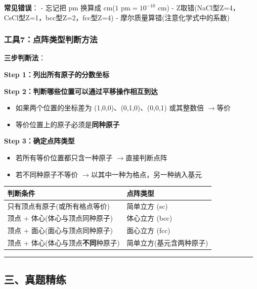 \documentclass[a4paper,11pt]{ctexart}
\providecommand{\tightlist}{\setlength{\itemsep}{0pt}\setlength{\parskip}{0pt}}
\newcounter{none}
\newcommand{\箭}{\ensuremath{\rightarrow}}
\newcommand{\左箭}{\ensuremath{\leftarrow}}
\newcommand{\上箭}{\ensuremath{\uparrow}}
\newcommand{\下箭}{\ensuremath{\downarrow}}
\newcommand{\衡}{\ensuremath{\rightleftharpoons}}
\newcommand{\双箭}{\ensuremath{\leftrightarrow}}
\newcommand{\约等于}{\ensuremath{\approx}}
\newcommand{\小于等于}{\ensuremath{\leq}}
\newcommand{\大于等于}{\ensuremath{\geq}}
\newcommand{\不等于}{\ensuremath{\neq}}
\newcommand{\西格马}{\ensuremath{\sigma}}
\newcommand{\派}{\ensuremath{\pi}}
\begin{document}
\textbf{常见错误}：
- 忘记把 pm 换算成 cm(\(1 \text{ pm} = 10^{-10} \text{ cm}\))
- Z取错(NaCl型Z=4，CsCl型Z=1，bcc型Z=2，fcc型Z=4)
- 摩尔质量算错(注意化学式中的系数)

\subsubsection{工具7：点阵类型判断方法}\label{ux5de5ux51777ux70b9ux9635ux7c7bux578bux5224ux65adux65b9ux6cd5}

\textbf{三步判断法}：

\textbf{Step 1：列出所有原子的分数坐标}

\textbf{Step 2：判断哪些位置可以通过平移操作相互到达}

\begin{itemize}
\tightlist
\item
  如果两个位置的坐标差为 (1,0,0)、(0,1,0)、(0,0,1) 或其整数倍 \箭 等价
\item
  等价位置上的原子必须是\textbf{同种原子}
\end{itemize}

\textbf{Step 3：确定点阵类型}

\begin{itemize}
\tightlist
\item
  若所有等价位置都只含一种原子 \箭 直接判断点阵
\item
  若不同种原子不等价 \箭 以其中一种为格点，另一种纳入基元
\end{itemize}

{\def\LTcaptype{none} %
\begin{longtable}[]{@{}ll@{}}
\toprule\noalign{}
判断条件 & 点阵类型 \\
\midrule\noalign{}
\endhead
\bottomrule\noalign{}
\endlastfoot
只有顶点有原子(或所有格点等价) & 简单立方 (sc) \\
顶点 + 体心(体心与顶点同种原子) & 体心立方 (bcc) \\
顶点 + 面心(面心与顶点同种原子) & 面心立方 (fcc) \\
顶点 + 体心(体心与顶点\textbf{不同}种原子) & 简单立方(基元含两种原子) \\
\end{longtable}
}

\begin{center}\rule{0.5\linewidth}{0.5pt}\end{center}

\subsection{三、真题精练}\label{ux4e09ux771fux9898ux7cbeux7ec3-2}
\end{document}
